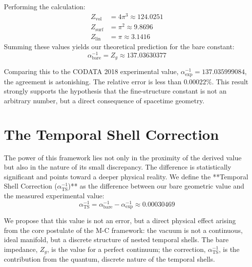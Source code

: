 \documentclass[11pt,a4paper]{article}
\begin{document}
Performing the calculation:
\begin{align}
    Z_{\text{vol}} &= 4\pi^3 \approx 124.0251 \\
    Z_{\text{surf}} &= \pi^2 \approx 9.8696 \\
    Z_{\text{lin}} &= \pi \approx 3.1416
\end{align}
Summing these values yields our theoretical prediction for the bare constant:
\begin{equation}
    \alpha^{-1}_{\text{bare}} = Z_g \approx 137.03630377
\end{equation}

Comparing this to the CODATA 2018 experimental value, $\alpha^{-1}_{\text{exp}} = 137.035999084$, the agreement is astonishing. The relative error is less than $0.00022\%$. This result strongly supports the hypothesis that the fine-structure constant is not an arbitrary number, but a direct consequence of spacetime geometry.

\section{The Temporal Shell Correction}
The power of this framework lies not only in the proximity of the derived value but also in the nature of its small discrepancy. The difference is statistically significant and points toward a deeper physical reality. We define the **Temporal Shell Correction ($\alpha^{-1}_{\text{TS}}$)** as the difference between our bare geometric value and the measured experimental value:
\begin{equation}
    \alpha^{-1}_{\text{TS}} = \alpha^{-1}_{\text{bare}} - \alpha^{-1}_{\text{exp}} \approx 0.00030469
\end{equation}

We propose that this value is not an error, but a direct physical effect arising from the core postulate of the M-C framework: the vacuum is not a continuous, ideal manifold, but a discrete structure of nested temporal shells. The bare impedance, $Z_g$, is the value for a perfect continuum; the correction, $\alpha^{-1}_{\text{TS}}$, is the contribution from the quantum, discrete nature of the temporal shells.
\end{document}
